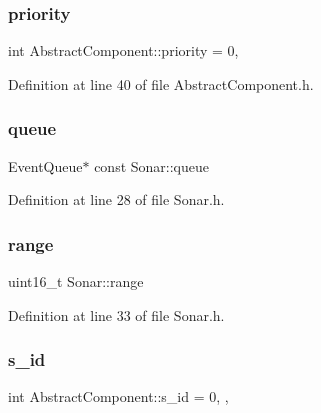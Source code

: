 \mbox{\label{class_abstract_component_aff57dfa5f31be093a06b55560e33fb95}} 
\subsubsection{\texorpdfstring{priority}{priority}}
{\footnotesize\ttfamily int Abstract\+Component\+::priority = 0\hspace{0.3cm}{\ttfamily [protected]}, {\ttfamily [inherited]}}



Definition at line 40 of file Abstract\+Component.\+h.

\mbox{\label{class_sonar_af0431d160853c8313eba0fd0e1ce8346}} 
\subsubsection{\texorpdfstring{queue}{queue}}
{\footnotesize\ttfamily Event\+Queue$\ast$ const Sonar\+::queue\hspace{0.3cm}{\ttfamily [private]}}



Definition at line 28 of file Sonar.\+h.

\mbox{\label{class_sonar_a6b0f78a9151925ca61fe54c852c195bd}} 
\subsubsection{\texorpdfstring{range}{range}}
{\footnotesize\ttfamily uint16\+\_\+t Sonar\+::range\hspace{0.3cm}{\ttfamily [private]}}



Definition at line 33 of file Sonar.\+h.

\mbox{\label{class_abstract_component_a99ce3e5fe7d73dac569b874c15fcaf0d}} 
\subsubsection{\texorpdfstring{s\+\_\+id}{s\_id}}
{\footnotesize\ttfamily int Abstract\+Component\+::s\+\_\+id = 0\hspace{0.3cm}{\ttfamily [static]}, {\ttfamily [protected]}, {\ttfamily [inherited]}}



